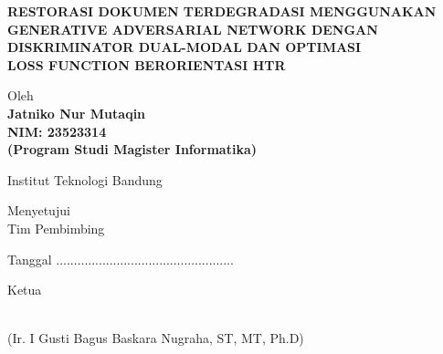 
\begin{center}
    \begingroup
    \fontsize{14pt}{16.8pt}\selectfont %
    \bfseries
    \MakeUppercase{Restorasi Dokumen Terdegradasi Menggunakan \\ Generative Adversarial Network dengan \\
    Diskriminator Dual-Modal dan Optimasi \\ Loss Function Berorientasi HTR}
    \par
    \endgroup

    \vspace{2.5cm} %

    Oleh\\
    \vspace{0.3cm}
    \textbf{Jatniko Nur Mutaqin}\\
    \textbf{NIM: 23523314}\\
    \textbf{(Program Studi Magister Informatika)}

    \vspace{1.0cm}

    Institut Teknologi Bandung

    \vspace{2.5cm}

    Menyetujui\\
    Tim Pembimbing

    \vspace{0.5cm}
    
    Tanggal ..................................................

    \vspace{1.0cm}

    Ketua

    \vspace{2.5cm} %

    \underline{\hspace{7cm}} \\ %
    (Ir. I Gusti Bagus Baskara Nugraha, ST, MT, Ph.D)

    \vspace{1.5cm}


\end{center}
